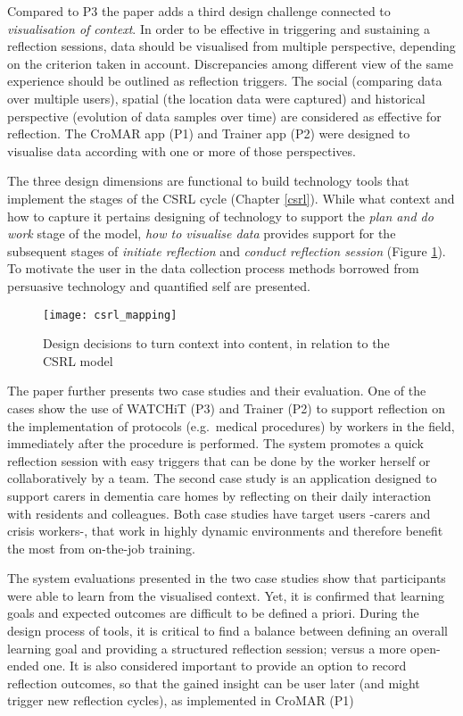 Compared to P3 the paper adds a third design challenge connected to \emph{visualisation of context}. In order to be effective in triggering and sustaining a reflection sessions, data should be visualised from multiple perspective, depending on the criterion taken in account. Discrepancies among different view of the same experience should be outlined as reflection triggers. The social (comparing data over multiple users), spatial (the location data were captured) and historical perspective (evolution of data samples over time) are considered as effective for reflection. The CroMAR app (P1) and Trainer app (P2) were designed to visualise data according with one or more of those perspectives.

The three design dimensions are functional to build technology tools that implement the stages of the CSRL cycle (Chapter \ref{csrl}). While what context and how to capture it pertains designing of technology to support the \emph{plan and do work} stage of the model, \emph{how to visualise data} provides support for the subsequent stages of \emph{initiate reflection} and \emph{conduct reflection session} (Figure \ref{fig:csrl-mapping}). To motivate the user in the data collection process methods borrowed from persuasive technology and quantified self are presented.
\begin{figure}
	[tbh] \centering 
	\texttt{[image: csrl\_mapping]} \caption{Design decisions to turn context into content, in relation to the CSRL model} \label{fig:csrl-mapping} 
\end{figure}

The paper further presents two case studies and their evaluation. One of the cases show the use of WATCHiT (P3) and Trainer (P2) to support reflection on the implementation of protocols (e.g.~medical procedures) by workers in the field, immediately after the procedure is performed. The system promotes a quick reflection session with easy triggers that can be done by the worker herself or collaboratively by a team. The second case study is an application designed to support carers in dementia care homes by reflecting on their daily interaction with residents and colleagues. Both case studies have target users -carers and crisis workers-, that work in highly dynamic environments and therefore benefit the most from on-the-job training.

The system evaluations presented in the two case studies show that participants were able to learn from the visualised context. Yet, it is confirmed that learning goals and expected outcomes are difficult to be defined a priori. During the design process of tools, it is critical to find a balance between defining an overall learning goal and providing a structured reflection session; versus a more open-ended one. It is also considered important to provide an option to record reflection outcomes, so that the gained insight can be user later (and might trigger new reflection cycles), as implemented in CroMAR (P1)

